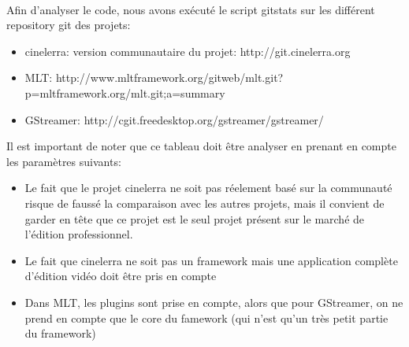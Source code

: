 \paragraph{}

Afin d'analyser le code, nous avons exécuté le script gitstats sur
les différent repository git des projets:

\begin{itemize}

  \item {cinelerra: version communautaire du projet:
  http://git.cinelerra.org }

  \item {MLT:
http://www.mltframework.org/gitweb/mlt.git?p=mltframework.org/mlt.git;a=summary}

  \item {GStreamer: http://cgit.freedesktop.org/gstreamer/gstreamer/ }

\end{itemize}

Il est important de noter que ce tableau doit être analyser en prenant
en compte les paramètres suivants:

\begin{itemize}

  \item {Le fait que le projet cinelerra ne soit pas réelement basé
  sur la communauté
    risque de faussé la comparaison avec les autres projets, mais il
    convient de garder en tête que ce projet est le seul projet présent
    sur le marché de l'édition professionnel.}


  \item {Le fait que cinelerra ne soit pas un framework mais une
    application complète d'édition vidéo doit être pris en compte}

  \item {Dans MLT, les plugins sont prise en compte, alors
  que pour
    GStreamer, on ne prend en compte que le core du famework (qui n'est
    qu'un très petit partie du framework)}

\end{itemize}

